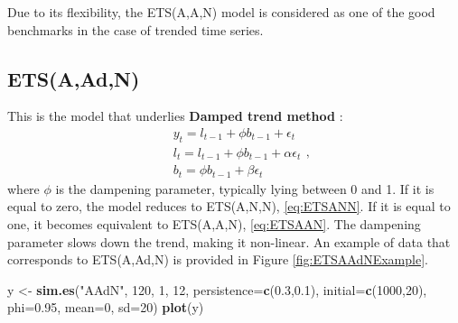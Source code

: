 \documentclass[]{book}
\newenvironment{Shaded}{\begin{snugshade}}{\end{snugshade}}
\newcommand{\DataTypeTok}[1]{\textcolor[rgb]{0.13,0.29,0.53}{#1}}
\newcommand{\DecValTok}[1]{\textcolor[rgb]{0.00,0.00,0.81}{#1}}
\newcommand{\FloatTok}[1]{\textcolor[rgb]{0.00,0.00,0.81}{#1}}
\newcommand{\KeywordTok}[1]{\textcolor[rgb]{0.13,0.29,0.53}{\textbf{#1}}}
\newcommand{\NormalTok}[1]{#1}
\newcommand{\StringTok}[1]{\textcolor[rgb]{0.31,0.60,0.02}{#1}}
\theoremstyle{definition}
\theoremstyle{definition}
\theoremstyle{definition}
\theoremstyle{definition}
\theoremstyle{remark}
\begin{document}
Due to its flexibility, the ETS(A,A,N) model is considered as one of the good benchmarks in the case of trended time series.

\hypertarget{ETSAAdN}{%
\subsection{ETS(A,Ad,N)}\label{ETSAAdN}}

This is the model that underlies \textbf{Damped trend method} \citep{Roberts1982, Gardner1985a}:
\begin{equation}
  \begin{aligned}
    & y_{t} = l_{t-1} + \phi b_{t-1} + \epsilon_t \\
    & l_t = l_{t-1} + \phi b_{t-1} + \alpha \epsilon_t \\
    & b_t = \phi b_{t-1} + \beta \epsilon_t
  \end{aligned} ,
  \label{eq:ETSAAdN}
\end{equation}
where \(\phi\) is the dampening parameter, typically lying between 0 and 1. If it is equal to zero, the model reduces to ETS(A,N,N), \eqref{eq:ETSANN}. If it is equal to one, it becomes equivalent to ETS(A,A,N), \eqref{eq:ETSAAN}. The dampening parameter slows down the trend, making it non-linear. An example of data that corresponds to ETS(A,Ad,N) is provided in Figure \ref{fig:ETSAAdNExample}.

\begin{Shaded}
\begin{Highlighting}[]
\NormalTok{y <-}\StringTok{ }\KeywordTok{sim.es}\NormalTok{(}\StringTok{"AAdN"}\NormalTok{, }\DecValTok{120}\NormalTok{, }\DecValTok{1}\NormalTok{, }\DecValTok{12}\NormalTok{, }\DataTypeTok{persistence=}\KeywordTok{c}\NormalTok{(}\FloatTok{0.3}\NormalTok{,}\FloatTok{0.1}\NormalTok{),}
            \DataTypeTok{initial=}\KeywordTok{c}\NormalTok{(}\DecValTok{1000}\NormalTok{,}\DecValTok{20}\NormalTok{), }\DataTypeTok{phi=}\FloatTok{0.95}\NormalTok{, }\DataTypeTok{mean=}\DecValTok{0}\NormalTok{, }\DataTypeTok{sd=}\DecValTok{20}\NormalTok{)}
\KeywordTok{plot}\NormalTok{(y)}
\end{Highlighting}
\end{Shaded}
\end{document}
